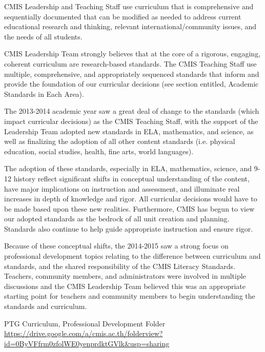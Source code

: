 \documentclass{report}
\begin{document}
\begin{findings}
CMIS Leadership and Teaching Staff use curriculum that is comprehensive and sequentially documented  that can be modified as needed to address current educational research and thinking, relevant international/community issues, and the needs of all students.

CMIS Leadership Team strongly believes that at the core of a rigorous, engaging, coherent curriculum are research-based standards. The  CMIS Teaching Staff use multiple, comprehensive, and appropriately sequenced standards that inform and provide the foundation of our curricular decisions (see section entitled, Academic Standards in Each Area). 

The 2013-2014 academic year saw a great deal of change to the standards (which impact curricular decisions) as the CMIS Teaching Staff, with the support of the Leadership Team adopted new standards in ELA, mathematics, and science, as well as finalizing the adoption of all other content standards (i.e. physical education, social studies, health, fine arts, world languages). 

The adoption of these standards, especially in ELA, mathematics, science, and 9-12 history  reflect significant shifts in conceptual understanding of the content, have major implications on instruction and assessment, and illuminate real increases in depth of knowledge and rigor. All curricular decisions would have to be made based upon these new realities. Furthermore, CMIS has begun to view our adopted standards as the bedrock of all unit creation and planning. Standards also continue to help guide appropriate instruction and ensure rigor. 

Because of these conceptual shifts, the 2014-2015 saw a strong focus on professional development topics relating to the difference between curriculum and standards, and the shared responsibility of the CMIS Literacy Standards. Teachers, community members, and administrators were involved in multiple discussions and the CMIS Leadership Team believed this was an appropriate starting point for teachers and community members to begin understanding the standards and curriculum.
\end{findings}

\begin{evidence}
\item PTG Curriculum, Professional Development Folder \url{https://drive.google.com/a/cmis.ac.th/folderview?id=0ByVFfrm0zfolWE0yenprdktGVlk&usp=sharing}
\end{evidence}
\end{document}
